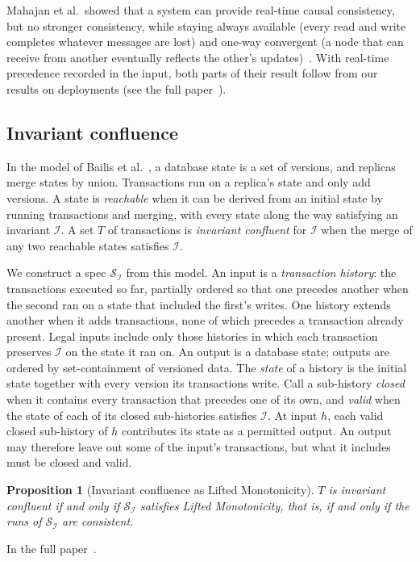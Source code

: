 \documentclass[sigconf]{cidr-2027}
\makeatletter
\newtheorem{proposition}{Proposition}
\theoremstyle{remark}
\newcommand{\inrel}{extends\xspace}          %
\newcommand{\Spec}{\mathcal{S}}
\newcommand{\extended}{the full paper~\cite{hellerstein2026completecalmfull}}
\newcommand{\proofinfull}{\par\pushQED{\qed}\normalfont\topsep2\p@\relax
  \trivlist\item[\@proofindent\hskip\labelsep{\@proofnamefont\proofname\@addpunct{.}}]%
  \ignorespaces In the full paper~\cite{hellerstein2026completecalmfull}.%
  \popQED\endtrivlist\@endpefalse}
\makeatother
\begin{document}
Mahajan et al.\ showed that a system can provide real-time causal consistency,
but no stronger consistency, while staying always available (every read and
write completes whatever messages are lost) and one-way convergent (a node that
can receive from another eventually reflects the other's
updates)~\cite{mahajan2011consistency}.  With real-time precedence recorded in
the input, both parts of their result follow from our results on deployments (see \extended).

\subsection{Invariant confluence}
\label{sec:iconfluence-instance}

In the model of Bailis et al.~\cite{bailis2014coordination}, a database state
is a set of versions, and replicas merge states by union.  Transactions run on
a replica's state and only add versions.  A state is \emph{reachable} when it
can be derived from an initial state by running transactions and merging, with
every state along the way satisfying an invariant $\mathcal I$.  A set $T$ of
transactions is \emph{invariant confluent} for $\mathcal I$ when the merge of
any two reachable states satisfies $\mathcal I$.

We construct a spec $\Spec_{\mathcal I}$ from this model.  An input is a
\emph{transaction history}: the transactions executed so far, partially
ordered so that one precedes another when the second ran on a state that
included the first's writes.  One history \inrel another when it adds
transactions, none of which precedes a transaction already present.  Legal
inputs include only those histories in which each transaction preserves
$\mathcal I$ on the state it ran on.  An output is a database state; outputs
are ordered by set-containment of versioned data.  The \emph{state} of a
history is the initial state together with every version its transactions
write.  Call a sub-history \emph{closed} when it contains every transaction
that precedes one of its own, and \emph{valid} when the state of each of its
closed sub-histories satisfies $\mathcal I$.  At input $h$, each valid
closed sub-history of $h$ contributes its state as a permitted output.
An output may therefore leave out some of the input's transactions, but what
it includes must be closed and valid.

\begin{proposition}[Invariant confluence as Lifted Monotonicity]
\label{prop:iconfluence-lm}
$T$ is invariant confluent if and only if $\Spec_{\mathcal I}$ satisfies Lifted
Monotonicity, that is, if and only if the runs of $\Spec_{\mathcal I}$ are consistent.
\end{proposition}
\proofinfull
\end{document}
